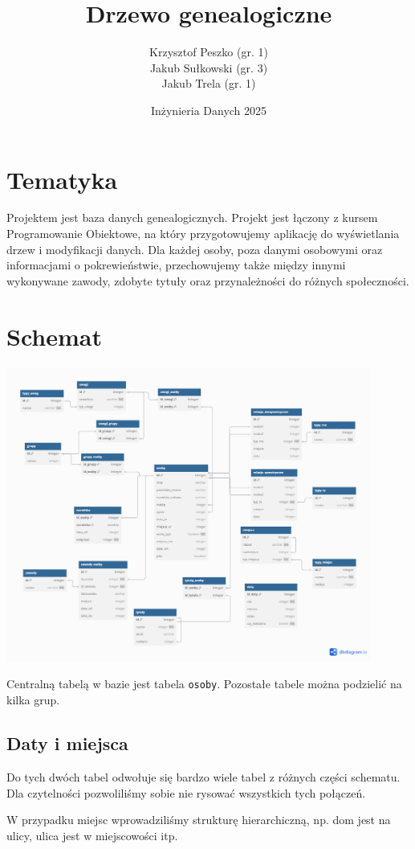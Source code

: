 \documentclass{article}
\title{Drzewo genealogiczne}
\author{Krzysztof Peszko (gr. 1) \\
Jakub Sułkowski (gr. 3) \\ Jakub Trela (gr. 1)}
\date{Inżynieria Danych 2025}
\begin{document}
\maketitle

\section{Tematyka}
Projektem jest baza danych genealogicznych. Projekt jest łączony z kursem Programowanie Obiektowe, na który przygotowujemy aplikację do wyświetlania drzew i modyfikacji danych. Dla każdej osoby, poza danymi osobowymi oraz informacjami o pokrewieństwie, przechowujemy także między innymi wykonywane zawody, zdobyte tytuły oraz przynależności do różnych społeczności.

\section{Schemat}
\begin{center}
    \includegraphics[width=0.9\textwidth]{img/Database_plan.png}
\end{center}
Centralną tabelą w bazie jest tabela \texttt{osoby}. Pozostałe tabele można podzielić na kilka grup.

\subsection{Daty i miejsca}
Do tych dwóch tabel odwołuje się bardzo wiele tabel z różnych części schematu. Dla czytelności pozwoliliśmy sobie nie rysować wszystkich tych połączeń.

W przypadku miejsc wprowadziliśmy strukturę hierarchiczną, np. dom jest na ulicy, ulica jest w miejscowości itp.
\end{document}
